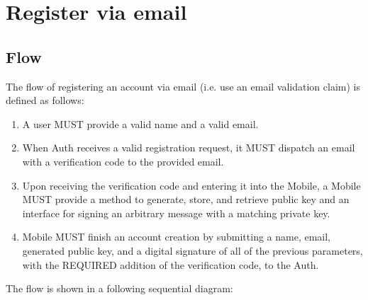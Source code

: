 \section{Register via email}

    \subsection{Flow}
    The flow of registering an account via email (i.e. use an email validation claim) is defined as follows:
        \begin{enumerate}
            \item A user MUST provide a valid name and a valid email.
            \item When Auth receives a valid registration request, it MUST dispatch an email with a verification 
                  code to the provided email.
            \item Upon receiving the verification code and entering it into the Mobile, a Mobile MUST provide a 
                  method to generate, store, and retrieve public key and an interface for signing an arbitrary 
                  message with a matching private key.
            \item Mobile MUST finish an account creation by submitting a name, email, generated public key, and 
                  a digital signature of all of the previous parameters, with the REQUIRED addition of the 
                  verification code, to the Auth.
        \end{enumerate}

    The flow is shown in a following sequential diagram:
    
        

